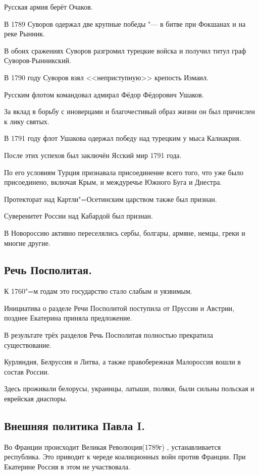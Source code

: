 Русская армия берёт Очаков. 

В 1789 Суворов одержал две крупные победы "--- в битве при Фокшанах и на реке Рынник. 

В обоих сражениях Суворов разгромил турецкие войска и получил титул граф Суворов-Рынникский.

В 1790 году Суворов взял <<неприступную>> крепость Измаил. 

Русским флотом командовал адмирал Фёдор Фёдорович Ушаков. 

За вклад в борьбу с иноверцами и благочестивый образ жизни он был причислен к лику святых.

В 1791 году флот Ушакова одержал победу над турецким у мыса Калиакрия.

После этих успехов был заключён Ясский мир 1791 года. 

По его условиям Турция признавала присоединение всего того, что уже было присоединено, включая Крым, и междуречье Южного Буга и Днестра. 

Протекторат над Картли"=Осетинским царством также был признан. 

Суверенитет России над Кабардой был признан.

В Новороссию активно переселялись сербы, болгары, армяне, немцы, греки и многие другие.

\subsection{Речь Посполитая.}

К 1760"=м годам это государство стало слабым и уязвимым. 

Инициатива о разделе Речи Посполитой поступила от Пруссии и Австрии, позднее Екатерина приняла предложение. 

В результате трёх разделов Речь Посполитая полностью прекратила существование. 

Курляндия, Белруссия и Литва, а также правобережная Малороссия вошли в состав России. 

Здесь проживали белорусы, украинцы, латыши, поляки, были сильны польская и еврейская диаспоры.

\subsection{Внешняя политика Павла I.}

Во Франции происходит Великая Революция(1789г) , устанавливается республика. Это приводит к череде коалиционных войн против Франции. При Екатерине Россия в этом не участвовала.

